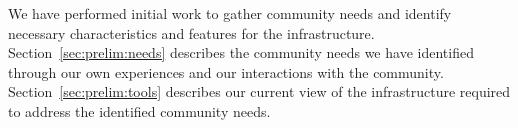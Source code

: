 
We have performed initial work to gather community needs and identify necessary characteristics and features for the infrastructure. Section~\ref{sec:prelim:needs} describes the community needs we have identified through our own experiences and our interactions with the community. Section~\ref{sec:prelim:tools} describes our current view of the infrastructure required to address the identified community needs.

